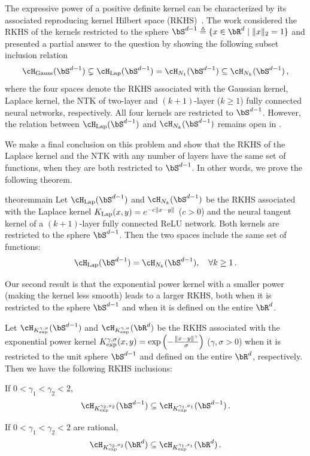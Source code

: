 \documentclass[11pt]{article}
\newcommand{\hlap}{\cH_{\textnormal{Lap}}}
\newcommand{\klap}{K_{\textnormal{Lap}}}
\newcommand{\kexp}{K_{\textnormal{exp}}}
\begin{document}
The expressive power of a positive definite kernel can be characterized by its associated reproducing kernel Hilbert space (RKHS)~\citep{saitoh2016theory}. 
The work \citep{geifman2020similarity} considered the RKHS of the kernels restricted to the sphere $\bS^{d-1} \triangleq  \{x\in \bR^d \mid \|x\|_2=1\}$ and presented a partial answer to the question by showing the following subset inclusion relation \[
\cH_{\textnormal{Gauss}}(\bS^{d-1}) \subsetneq \hlap(\bS^{d-1}) = \cH_{N_1}(\bS^{d-1}) \subseteq \cH_{N_k}(\bS^{d-1})\,,
\] 
where the four spaces denote the RKHS associated with the Gaussian kernel, Laplace kernel, the NTK of two-layer and $(k+1)$-layer ($k\ge 1$) fully connected neural networks, respectively. All four kernels are restricted to $\bS^{d-1}$. 
However, the relation between $\hlap(\bS^{d-1})$ and $\cH_{N_k}(\bS^{d-1})$ remains open in \citep{geifman2020similarity}.

We make a final conclusion on this problem and show that the RKHS of the Laplace kernel and the NTK with any number of layers have the same set of functions, when they are both restricted to $\bS^{d-1}$. In other words, we prove the following theorem. 
\begin{restatable}{theorem}{main}\label{thm:main}
Let $\hlap(\bS^{d-1})$ and $\cH_{N_k}(\bS^{d-1})$ be the RKHS associated with the Laplace kernel $\klap(x,y) = e^{-c\|x-y\|}$ ($c>0$) and the neural tangent kernel of a $(k+1)$-layer fully connected ReLU network. Both kernels are restricted to the sphere $\bS^{d-1}$. Then the two spaces include the same set of functions:
\[
\hlap(\bS^{d-1}) = \cH_{N_k}(\bS^{d-1}),\quad \forall k\ge 1\,.
\]
\end{restatable}



Our second result is that the exponential power kernel with a smaller power (making the kernel less smooth) leads to a larger RKHS, both when it is restricted to the sphere $\bS^{d-1}$ and when it is defined on the entire $\bR^d$. 

\begin{theorem}\label{thm:exp-rkhs}
Let $\cH_{\kexp^{\gamma,\sigma}}(\bS^{d-1})$ and $\cH_{\kexp^{\gamma,\sigma}}(\bR^d)$ be the RKHS associated with the exponential power kernel $\kexp^{\gamma,\sigma}(x,y) = \exp\left(-\frac{\|x-y\|^\gamma}{\sigma}\right)$ ($\gamma,\sigma>0$) when it is restricted to the unit sphere $\bS^{d-1}$ and defined on the entire $\bR^d$, respectively. Then we have the following RKHS inclusions:
\begin{compactenum}[(1)]
\item If $0<\gamma_1< \gamma_2 < 2$, \[
\cH_{\kexp^{\gamma_2,\sigma_2}}(\bS^{d-1}) \subseteq \cH_{\kexp^{\gamma_1,\sigma_1}}(\bS^{d-1})\,.
\]\label{it:exp-s}
\item If $0<\gamma_1< \gamma_2 < 2$ are rational, 
 \[\cH_{\kexp^{\gamma_2,\sigma_2}}(\bR^d) \subseteq \cH_{\kexp^{\gamma_1,\sigma_1}}(\bR^d)\,.\]\label{it:exp-r}
\end{compactenum}
\end{theorem}
\end{document}
